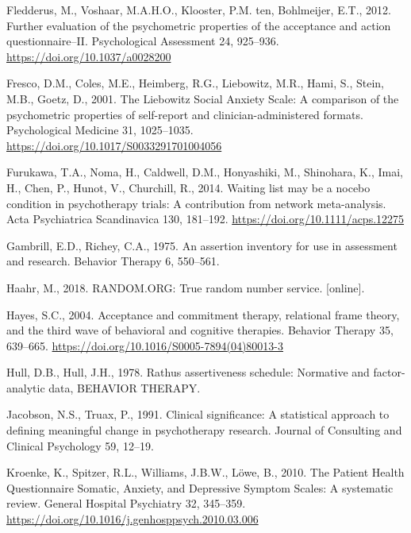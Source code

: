 \documentclass[preprint,
3p]{elsarticle} %
\newlength{\cslhangindent}
\newlength{\cslentryspacingunit} %
\newenvironment{CSLReferences}[2] %
 {%
  \setlength{\parindent}{0pt}
  \ifodd #1
  \let\oldpar\par
  \def\par{\hangindent=\cslhangindent\oldpar}
  \fi
  \setlength{\parskip}{#2\cslentryspacingunit}
 }%
 {}
\begin{document}
\begin{CSLReferences}{1}{0}
\leavevmode{}%
Fledderus, M., Voshaar, M.A.H.O., Klooster, P.M. ten, Bohlmeijer, E.T.,
2012. Further evaluation of the psychometric properties of the
acceptance and action questionnaire--II. Psychological Assessment 24,
925--936. \url{https://doi.org/10.1037/a0028200}

\leavevmode{}%
Fresco, D.M., Coles, M.E., Heimberg, R.G., Liebowitz, M.R., Hami, S.,
Stein, M.B., Goetz, D., 2001. {The Liebowitz Social Anxiety Scale: A
comparison of the psychometric properties of self-report and
clinician-administered formats}. Psychological Medicine 31, 1025--1035.
\url{https://doi.org/10.1017/S0033291701004056}

\leavevmode{}%
Furukawa, T.A., Noma, H., Caldwell, D.M., Honyashiki, M., Shinohara, K.,
Imai, H., Chen, P., Hunot, V., Churchill, R., 2014. Waiting list may be
a nocebo condition in psychotherapy trials: A contribution from network
meta-analysis. Acta Psychiatrica Scandinavica 130, 181--192.
\url{https://doi.org/10.1111/acps.12275}

\leavevmode{}%
Gambrill, E.D., Richey, C.A., 1975. {An assertion inventory for use in
assessment and research}. Behavior Therapy 6, 550--561.

\leavevmode{}%
Haahr, M., 2018. {RANDOM.ORG:} True random number service. {[}online{]}.

\leavevmode{}%
Hayes, S.C., 2004. {Acceptance and commitment therapy, relational frame
theory, and the third wave of behavioral and cognitive therapies}.
Behavior Therapy 35, 639--665.
\url{https://doi.org/10.1016/S0005-7894(04)80013-3}

\leavevmode{}%
Hull, D.B., Hull, J.H., 1978. Rathus assertiveness schedule: Normative
and factor-analytic data, BEHAVIOR THERAPY.

\leavevmode{}%
Jacobson, N.S., Truax, P., 1991. {Clinical significance: A statistical
approach to defining meaningful change in psychotherapy research}.
Journal of Consulting and Clinical Psychology 59, 12--19.

\leavevmode{}%
Kroenke, K., Spitzer, R.L., Williams, J.B.W., Löwe, B., 2010. {The
Patient Health Questionnaire Somatic, Anxiety, and Depressive Symptom
Scales: A systematic review}. General Hospital Psychiatry 32, 345--359.
\url{https://doi.org/10.1016/j.genhosppsych.2010.03.006}


\end{CSLReferences}
\end{document}
